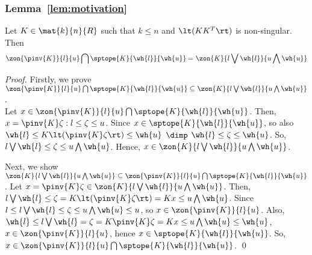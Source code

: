 
%
\subsubsection*{Lemma~\ref{lem:motivation}}
Let $K\in\mat{k}{n}{R}$ such that $k\leq n$ and $\lt(KK^T\rt)$ is
non-singular.  Then
\[
\zon{\pinv{K}}{l}{u} \bigcap \sptope{K}{\wh{l}}{\wh{u}}
= \zon{K}{l\bigvee \wh{l}}{u\bigwedge \wh{u}}
\]
\begin{proof}
Firstly, we prove $\zon{\pinv{K}}{l}{u} \bigcap
\sptope{K}{\wh{l}}{\wh{u}} \subseteq \zon{K}{l\bigvee
  \wh{l}}{u\bigwedge \wh{u}}$.\\  Let $x\in\zon{\pinv{K}}{l}{u} \bigcap
\sptope{K}{\wh{l}}{\wh{u}}$.  Then, $x=\pinv{K}\zeta:
l\leq\zeta\leq u$.  Since $x\in\sptope{K}{\wh{l}}{\wh{u}}$, so also
$\wh{l}\leq K\lt(\pinv{K}\zeta\rt)\leq \wh{u}$ $\dimp$ $\wh{l}\leq \zeta\leq \wh{u}$.  So,
$l\bigvee \wh{l}\leq \zeta\leq u\bigwedge\wh{u}$.  Hence, $x\in\zon{K}{l\bigvee
  \wh{l}}{u\bigwedge \wh{u}}$.

Next, we show $\zon{K}{l\bigvee \wh{l}}{u\bigwedge \wh{u}} \subseteq
\zon{\pinv{K}}{l}{u} \bigcap \sptope{K}{\wh{l}}{\wh{u}}$. Let
$x=\pinv{K}\zeta\in\zon{K}{l\bigvee \wh{l}}{u\bigwedge \wh{u}}$.
Then, $l\bigvee\wh{l}\leq \zeta = K\lt(\pinv{K}\zeta\rt)=Kx\leq
u\bigwedge\wh{u}$.  Since $l\leq l\bigvee\wh{l} \leq \zeta\leq
u\bigwedge \wh{u}\leq u$, so $x\in \zon{\pinv{K}}{l}{u}$.  Also,
$\wh{l}\leq l\bigvee\wh{l} = \zeta = K\pinv{K}\zeta = Kx\leq
u\bigwedge \wh{u}\leq \wh{u}$, $x\in \zon{\pinv{K}}{l}{u}$, hence
$x\in\sptope{K}{\wh{l}}{\wh{u}}$.  So, $x\in\zon{\pinv{K}}{l}{u}
\bigcap \sptope{K}{\wh{l}}{\wh{u}}$. \qed
\end{proof}

